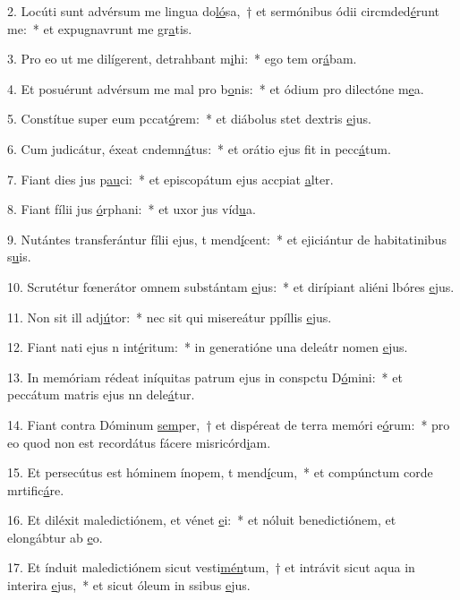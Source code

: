 2. Locúti sunt advérsum me lingua do\uline{ló}sa,~† et sermónibus ódii circmded\uline{é}runt me:~* et expugnavrunt me gr\uline{a}tis.\par 
3. Pro eo ut me dilígerent, detrahbant m\uline{i}hi:~* ego tem or\uline{á}bam.\par 
4. Et posuérunt advérsum me mal pro b\uline{o}nis:~* et ódium pro dilectóne m\uline{e}a.\par 
5. Constítue super eum pccat\uline{ó}rem:~* et diábolus stet  dextris \uline{e}jus.\par 
6. Cum judicátur, éxeat cndemn\uline{á}tus:~* et orátio ejus fit in pecc\uline{á}tum.\par 
7. Fiant dies jus p\uline{au}ci:~* et episcopátum ejus accpiat \uline{a}lter.\par 
8. Fiant fílii jus \uline{ó}rphani:~* et uxor jus víd\uline{u}a.\par 
9. Nutántes transferántur fílii ejus, t mend\uline{í}cent:~* et ejiciántur de habitatinibus s\uline{u}is.\par 
10. Scrutétur fœnerátor omnem substántam \uline{e}jus:~* et dirípiant aliéni lbóres \uline{e}jus.\par 
11. Non sit ill adj\uline{ú}tor:~* nec sit qui misereátur ppíllis \uline{e}jus.\par 
12. Fiant nati ejus n int\uline{é}ritum:~* in generatióne una deleátr nomen \uline{e}jus.\par 
13. In memóriam rédeat iníquitas patrum ejus in conspctu D\uline{ó}mini:~* et peccátum matris ejus nn dele\uline{á}tur.\par 
14. Fiant contra Dóminum \uline{sem}per,~† et dispéreat de terra memóri e\uline{ó}rum:~* pro eo quod non est recordátus fácere misricórd\uline{i}am.\par 
15. Et persecútus est hóminem ínopem, t mend\uline{í}cum,~* et compúnctum corde mrtific\uline{á}re.\par 
16. Et diléxit maledictiónem, et vénet \uline{e}i:~* et nóluit benedictiónem, et elongábtur ab \uline{e}o.\par 
17. Et índuit maledictiónem sicut vesti\uline{mén}tum,~† et intrávit sicut aqua in interira \uline{e}jus,~* et sicut óleum in ssibus \uline{e}jus.\par 
